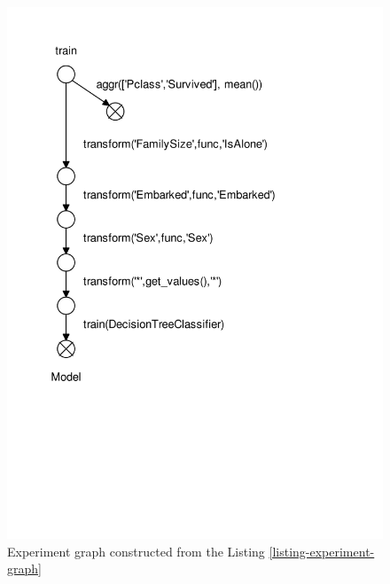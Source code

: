 \begin{figure}
\centering
\includegraphics[width=0.6\columnwidth]{../images/experiment-graph}
\caption{Experiment graph constructed from the Listing \ref{listing-experiment-graph}}
\label{fig-experiment-graph}
\end{figure}
